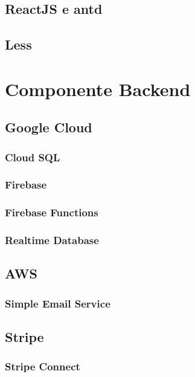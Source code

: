 \subsection{ReactJS e antd}
\subsection{Less}
\newpage
\section{Componente Backend}
\subsection{Google Cloud}
\subsubsection{Cloud SQL}
\subsubsection{Firebase}
\subsubsection{Firebase Functions}
\subsubsection{Realtime Database}
\subsection{AWS}
\subsubsection{Simple Email Service}
\subsection{Stripe}
\subsubsection{Stripe Connect}